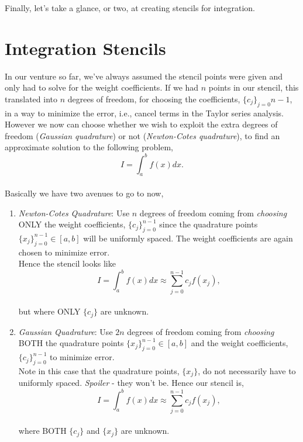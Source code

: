 \documentclass[paper=a4, fontsize=11pt]{scrartcl} %
\numberwithin{equation}{section} %
\numberwithin{figure}{section} %
\numberwithin{table}{section} %
\begin{document}
Finally, let's take a glance, or two, at creating stencils for integration. \\






%
%
%
%
%
%
%
%


\section{Integration Stencils}

$ $\\


In our venture so far, we've always assumed the stencil points were given and only had to solve for the weight coefficients. If we had $n$ points in our stencil, this translated into $n$ degrees of freedom, for choosing the coefficients, $\{c_{j}\}_{j=0}{n-1}$, in a way to minimize the error, i.e., cancel terms in the Taylor series analysis.\\

However we now can choose whether we wish to exploit the extra degrees of freedom (\emph{Gaussian quadrature}) or not (\emph{Newton-Cotes quadrature}), to find an approximate solution to the following problem,\\

$$I = \int_{a}^{b} f(x) dx.$$\\

Basically we have two avenues to go to now,

\begin{enumerate}
\item  \emph{Newton-Cotes Quadrature}: Use $n$ degrees of freedom coming from \emph{choosing} ONLY the weight coefficients, $\{c_j\}_{j=0}^{n-1}$ since the quadrature points $\{x_j\}_{j=0}^{n-1}\in[a,b]$ will be uniformly spaced. The weight coefficients are again chosen to minimize error. \\

Hence the stencil looks like\\ $$I = \int_{a}^{b} f(x) dx \approx \sum_{j=0}^{n-1} c_j f(x_j),$$\\

but where ONLY $\{c_j\}$ are unknown.\\

\item \emph{Gaussian Quadrature}: Use $2n$ degrees of freedom coming from \emph{choosing} BOTH the quadrature points $\{x_j\}_{j=0}^{n-1}\in[a,b]$ and the weight coefficients, $\{c_j\}_{j=0}^{n-1}$ to minimize error. \\

Note in this case that the quadrature points, $\{x_{j}\}$, do not necessarily have to uniformly spaced. \emph{Spoiler} - they won't be. Hence our stencil is,\\

$$I = \int_{a}^{b} f(x) dx \approx \sum_{j=0}^{n-1} c_j f(x_j),$$\\

where BOTH $\{c_j\}$ and $\{x_j\}$ are unknown.\\

\end{enumerate}
\end{document}
